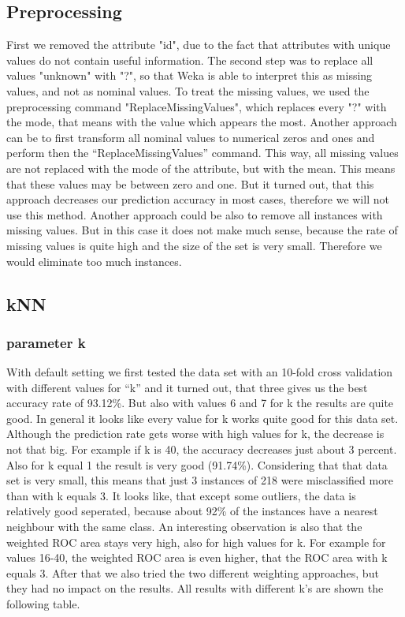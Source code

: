 \documentclass{article}
\begin{document}
\subsection{Preprocessing}
 
First we removed the attribute "id", due to the fact that attributes with unique values do not contain useful information. The second step was to replace all values "unknown" with "?", so that Weka is able to interpret this as missing values, and not as nominal values. To treat the missing values, we used the preprocessing command "ReplaceMissingValues", which replaces every "?" with the mode, that means with the value which appears the most.
Another approach can be to first transform all nominal values to numerical zeros and ones and perform then the “ReplaceMissingValues” command. This way, all missing values are not replaced with the mode of the attribute, but with the mean. This means that these values may be between zero and one. But it turned out, that this approach decreases our prediction accuracy in most cases, therefore we will not use this method.
Another approach could be also to remove all instances with missing values. But in this case it does not make much sense, because the rate of missing values is quite high and the size of the set is very small. Therefore we would eliminate too much instances. 
 

\subsection{kNN}
 

\subsubsection{parameter k}
 
With default setting we first tested the data set with an 10-fold cross validation with different values for “k” and it turned out, that three gives us the best accuracy rate of 93.12\%. But also with values 6 and 7 for k the results are quite good. In general it looks like every value for k works quite good for this data set. Although the prediction rate gets worse with high values for k, the decrease is not that big. For example if k is 40, the accuracy decreases just about 3 percent. Also for k equal 1 the result is very good (91.74\%). Considering that that data set is very small, this means that just 3 instances of 218 were misclassified more than with k equals 3. It looks like, that except some outliers, the data is relatively good seperated, because about 92\% of the instances have a nearest neighbour with the same class. An interesting observation is also that the weighted ROC area stays very high, also for high values for k. For example for values 16-40, the weighted ROC area is even higher, that the ROC area with k equals 3. After that we also tried the two different weighting approaches, but they had no impact on the results. All results with different k's are shown the following table.
 
\end{document}
